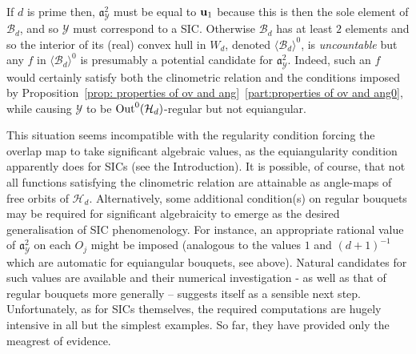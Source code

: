 \documentclass[12pt]{article}
\newcounter{example}[section]
\newcommand{\bbQ}{\ensuremath{\mathbb{Q}}}
\newcommand{\bu}{\ensuremath{{\bf u}}}
\newcommand{\cA}{\ensuremath{\mathcal{A}}}
\newcommand{\cB}{\ensuremath{\mathcal{B}}}
\newcommand{\cH}{\ensuremath{\mathcal{H}}}
\newcommand{\cO}{\ensuremath{\mathcal{O}}}
\newcommand{\cY}{\ensuremath{\mathcal{Y}}}
\newcommand{\fa}{\ensuremath{\mathfrak{a}}}
\newcommand{\ff}{\ensuremath{\mathfrak{f}}}
\newcommand{\inv}{^{-1}}%
\newcommand{\Out}{{\rm Out}}
\newcommand{\SL}{{\rm SL}}
\newcommand{\cAng}{{\frak O}}
\begin{document}
If $d$ is prime then, $\fa_\cY^2$ must be  equal to $\bu_1$ because this is then the sole element of $\cB_d$, and so $\cY$ must correspond to a SIC. 
Otherwise $\cB_d$ has at least $2$ elements and so the interior  of its (real) convex hull in $W_d$, denoted $\langle\cB_d\rangle^0$, is \textit{uncountable} but any $f$ in $\langle\cB_d\rangle^0$ is presumably a potential candidate for $\fa_\cY^2$. Indeed, such an $f$ would certainly satisfy both the clinometric relation and the conditions imposed by Proposition~\ref{prop: properties of ov and ang}~\ref{part:properties of ov and ang0}, while causing $\cY$ to be $\Out^0(\cH_d)$-regular but not equiangular.
%

This situation seems incompatible with the regularity condition forcing the overlap map to take significant algebraic values, as the equiangularity condition apparently does for SICs (see the Introduction). It is possible, of course, that not all functions satisfying the clinometric relation are attainable as angle-maps of free orbits of $\cH_d$. Alternatively, some additional condition(s) on regular bouquets may be required for significant algebraicity to emerge as the desired generalisation of SIC phenomenology. For instance, an appropriate rational value of $\fa_{\cY}^2$ on each $O_j$ might be imposed (analogous to the values $1$ and $(d+1)\inv$ which are automatic for equiangular bouquets, see above). Natural candidates for such values are available and their 
numerical investigation - as well as that of regular bouquets more generally -- suggests itself as a sensible next step. Unfortunately, as for SICs themselves, the required computations are hugely intensive in all but the simplest examples. So far, they have provided only the meagrest of evidence.  
\end{document}
